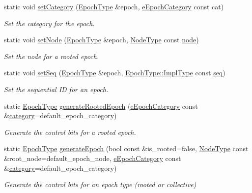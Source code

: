 \begin{DoxyCompactItemize}
static void \hyperlink{structvt_1_1epoch_1_1_epoch_manip_a5ef6f747225cf046cff1fb39945fa547}{set\+Category} (\hyperlink{structvt_1_1epoch_1_1_epoch_type}{Epoch\+Type} \&epoch, \hyperlink{namespacevt_1_1epoch_a956abe0aceef0d10a988de8acb002c7c}{e\+Epoch\+Category} const cat)
\begin{DoxyCompactList}\small\item\em Set the category for the {\ttfamily epoch}. \end{DoxyCompactList}\item 
static void \hyperlink{structvt_1_1epoch_1_1_epoch_manip_a5c4c075234fc7c263b0eabf09e85ef05}{set\+Node} (\hyperlink{structvt_1_1epoch_1_1_epoch_type}{Epoch\+Type} \&epoch, \hyperlink{namespacevt_a866da9d0efc19c0a1ce79e9e492f47e2}{Node\+Type} const \hyperlink{structvt_1_1epoch_1_1_epoch_manip_a7120f73ef583ab8f061334fc0bc519c3}{node})
\begin{DoxyCompactList}\small\item\em Set the node for a rooted {\ttfamily epoch}. \end{DoxyCompactList}\item 
static void \hyperlink{structvt_1_1epoch_1_1_epoch_manip_a89010fc0f701da8c0914c3bed0bd8249}{set\+Seq} (\hyperlink{structvt_1_1epoch_1_1_epoch_type}{Epoch\+Type} \&epoch, \hyperlink{structvt_1_1epoch_1_1_epoch_type_aef70d29ac80a421e67bc15ffbe9b9e70}{Epoch\+Type\+::\+Impl\+Type} const \hyperlink{structvt_1_1epoch_1_1_epoch_manip_a0205c8fbd8bafaf35c0102a061c0d09f}{seq})
\begin{DoxyCompactList}\small\item\em Set the sequential ID for an {\ttfamily epoch}. \end{DoxyCompactList}\item 
static \hyperlink{structvt_1_1epoch_1_1_epoch_type}{Epoch\+Type} \hyperlink{structvt_1_1epoch_1_1_epoch_manip_ac1a8c8f8d1799c05520a3bb6d2fcf6bf}{generate\+Rooted\+Epoch} (\hyperlink{namespacevt_1_1epoch_a956abe0aceef0d10a988de8acb002c7c}{e\+Epoch\+Category} const \&\hyperlink{structvt_1_1epoch_1_1_epoch_manip_aa61d47033545df147c01036211c4cabe}{category}=default\+\_\+epoch\+\_\+category)
\begin{DoxyCompactList}\small\item\em Generate the control bits for a rooted epoch. \end{DoxyCompactList}\item 
static \hyperlink{structvt_1_1epoch_1_1_epoch_type}{Epoch\+Type} \hyperlink{structvt_1_1epoch_1_1_epoch_manip_a6e96213acd8e0a160a4d4b9ab6a64eaf}{generate\+Epoch} (bool const \&is\+\_\+rooted=false, \hyperlink{namespacevt_a866da9d0efc19c0a1ce79e9e492f47e2}{Node\+Type} const \&root\+\_\+node=default\+\_\+epoch\+\_\+node, \hyperlink{namespacevt_1_1epoch_a956abe0aceef0d10a988de8acb002c7c}{e\+Epoch\+Category} const \&\hyperlink{structvt_1_1epoch_1_1_epoch_manip_aa61d47033545df147c01036211c4cabe}{category}=default\+\_\+epoch\+\_\+category)
\begin{DoxyCompactList}\small\item\em Generate the control bits for an epoch type (rooted or collective) \end{DoxyCompactList}\end{DoxyCompactItemize}

